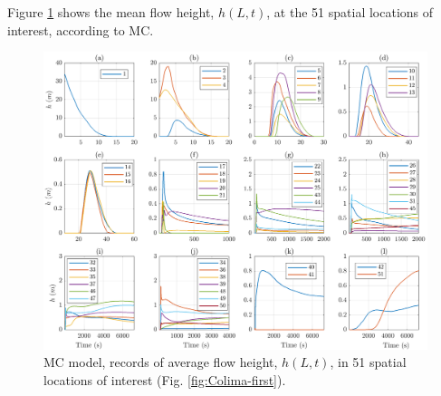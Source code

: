 \documentclass{article}
\begin{document}
Figure \ref{fig:BAF-H-MC} shows the mean flow height, $h(L,t)$, at the 51 spatial locations of interest, according to MC.
\begin{figure}[H]
         \centering
        \includegraphics[width=1\textwidth]{MC&VS_51/Height_MC2.png}
        \caption{MC model, records of average flow height, $h(L,t)$, in 51 spatial locations of interest (Fig. \ref{fig:Colima-first}).}
        \label{fig:BAF-H-MC}
\end{figure}
\end{document}
